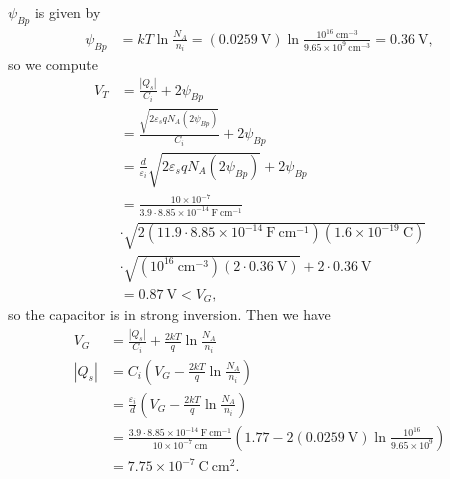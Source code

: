 \documentclass{article}
\begin{document}
$\psi_{Bp}$ is given by
\begin{align*}
\psi_{Bp} &= kT \ln \frac{N_A}{n_i} = (0.0259 ~\mathrm{V})
                                      \ln \frac{10^{16} ~\mathrm{cm}^{-3}}
                                               {9.65 \times 10^9 ~\mathrm{cm}^{-3}} 
                                    = 0.36 ~\mathrm{V},
\end{align*}
so we compute
\begin{align*}
          V_T &= \frac{|Q_s|}{C_i} + 2 \psi_{Bp} \\
              &= \frac{\sqrt{2 \varepsilon_s q N_A (2 \psi_{Bp})}}{C_i} + 2\psi_{Bp} \\
              &= \frac{d}{\varepsilon_i}\sqrt{2 \varepsilon_s q N_A (2 \psi_{Bp})} + 2\psi_{Bp} \\
              &= \frac{10 \times 10^{-7}}
                      {3.9 \cdot 8.85 \times 10^{-14} ~\mathrm{F}~\mathrm{cm}^{-1}} \\
              &\cdot \sqrt{2(11.9 \cdot 8.85 \times 10^{-14} ~\mathrm{F}~\mathrm{cm}^{-1})
                        (1.6 \times 10^{-19} ~\mathrm{C})} \\
              &\cdot \sqrt{
                        (10^{16} ~\mathrm{cm}^{-3})
                        (2 \cdot 0.36 ~\mathrm{V})}
               + 2 \cdot 0.36 ~\mathrm{V} \\
              &= 0.87 ~\mathrm{V} < V_G,
\end{align*}
so the capacitor is in strong inversion. Then we have
\begin{align*}
V_G &= \frac{|Q_s|}{C_i} + \frac{2kT}{q}\ln\frac{N_A}{n_i} \\
|Q_s| &= C_i\left(V_G - \frac{2kT}{q}\ln \frac{N_A}{n_i}\right) \\
      &= \frac{\varepsilon_i}{d}
         \left(V_G - \frac{2kT}{q}\ln\frac{N_A}{n_i}\right) \\
      &= \frac{3.9 \cdot 8.85 \times 10^{-14} ~\mathrm{F}~\mathrm{cm}^{-1}}
              {10 \times 10^{-7} ~\mathrm{cm}}
         \left(1.77 - 2 (0.0259 ~\mathrm{V})\ln\frac{10^{16}}{9.65 \times 10^9}\right) \\
      &= 7.75 \times 10^{-7} ~\mathrm{C}~\mathrm{cm}^{2}.
\end{align*}
\end{document}
